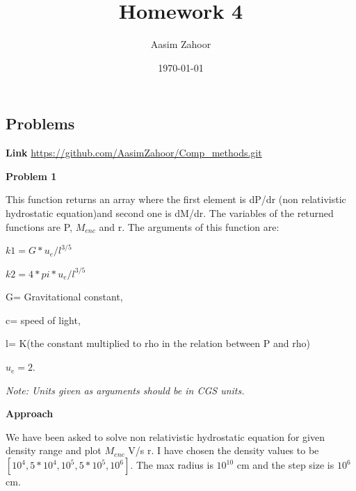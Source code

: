 \documentclass{article}
\title{Homework 4}
\author{Aasim Zahoor}
\date\today
\begin{document}
\maketitle 


\begin{center}
\section{Problems}
\end{center}
\textbf{Link}\vspace{1.5em}
\url{https://github.com/AasimZahoor/Comp_methods.git}
\vspace{1.5em}

\vspace{1.5em}
\textbf{Problem 1}\vspace{1.5em}


This function returns an array where the first element is dP/dr (non relativistic hydrostatic equation)and second one is dM/dr. The variables of the returned functions are P, $M_{enc}$ and r.
    The arguments of this function are:
      \vspace{0.2em}
      
    $k1=G*u_e/l^{3/5}$
    \vspace{0.2em}
    
    $k2=4*pi*u_e/l^{3/5}$
    \vspace{0.2em}
    
        G= Gravitational constant,
        \vspace{0.2em}
        
        c= speed of light,
        \vspace{0.2em}
        
        l= K(the constant multiplied to rho in the relation between P and rho)
        \vspace{0.2em}
        
        $u_{e}=2.$

          \vspace{0.2em}
        \emph{Note: Units given as arguments should be in CGS units.}
  
  \vspace{0.2em}
  
 \textbf{Approach}
 
 We have been asked to solve non relativistic hydrostatic equation for given density range and plot $M_{enc}$ V/s r. I have chosen the density values to be $[10^{4}, 5*10^{4}, 10^{5}, 5*10^{5},10^{6}]$. The max radius is $10^{10}$ cm and the step size is $10^{6} $cm. 
 
\end{document}
